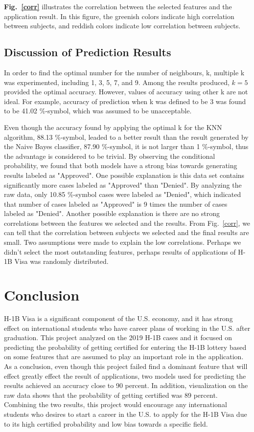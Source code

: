 \documentclass[conference]{IEEEtran}
\begin{document}
\textbf{Fig.~\ref{corr}} illustrates the correlation between the selected features and the application result. In this figure, the greenish colors indicate high correlation between subjects, and reddish colors indicate low correlation between subjects. 


\subsection{Discussion of Prediction Results}
In order to find the optimal number for the number of neighbours, k, multiple k was experimented, including 1, 3, 5, 7, and 9. Among the results produced, \(k = 5\) provided the optimal accuracy. However, values of accuracy using other k are not ideal. For example, accuracy of prediction when k was defined to be 3 was found to be 41.02 \%-symbol, which was assumed to be unacceptable. 

Even though the accuracy found by applying the optimal k for the KNN algorithm, 88.13 \%-symbol, leaded to a better result than the result generated by the Naive Bayes classifier, 87.90 \%-symbol, it is not larger than 1 \%-symbol, thus the advantage is considered to be trivial. By observing the conditional probability, we found that both models have a strong bias towards generating results labeled as "Approved". One possible explanation is this data set contains significantly more cases labeled as "Approved" than "Denied". By analyzing the raw data, only 10.85 \%-symbol cases were labeled as "Denied", which indicated that number of cases labeled as "Approved" is 9 times the number of cases labeled as "Denied". Another possible explanation is there are no strong correlations between the features we selected and the results. From {Fig.~\ref{corr}}, we can tell that the correlation between subjects we selected and the final results are small. Two assumptions were made to explain the low correlations. Perhaps we didn't select the most outstanding features, perhaps results of applications of H-1B Visa was randomly distributed. 


\section{Conclusion}

H-1B Visa is a significant component of the U.S. economy, and it has strong effect on international students who have career plans of working in the U.S. after graduation. This project analyzed on the 2019 H-1B cases and it focused on predicting the probability of getting certified for entering the H-1B lottery based on some features that are assumed to play an important role in the application. As a conclusion, even though this project failed find a dominant feature that will effect greatly effect the result of applications, two models used for predicting the results achieved an accuracy close to 90 percent. In addition, visualization on the raw data shows that the probability of getting certified was 89 percent. Combining the two results, this project would encourage any international students who desires to start a career in the U.S. to apply for the H-1B Visa due to its high certified probability and low bias towards a specific field.  
\end{document}
